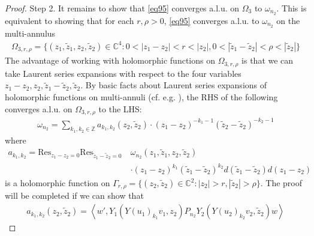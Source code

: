 \documentclass[11pt,b5paper,notitlepage]{article}
\theoremstyle{definition}
\theoremstyle{plain}
\newcommand{\wtd}{\widetilde}
\newcommand{\Res}{\mathrm{Res}}
\newcommand{\Cbb}{\mathbb C}
\newcommand{\Zbb}{\mathbb Z}
\newcommand{\<}{\left\langle}
\renewcommand{\>}{\right\rangle}
\numberwithin{equation}{subsection}
\begin{document}
\begin{proof}
Step 2. It remains to show that \eqref{eq95} converges a.l.u. on $\Omega_3$ to $\omega_{n_2}$. This is equivalent to showing that for each $r,\rho>0$, \eqref{eq95} converges a.l.u. to $\omega_{n_2}$ on the multi-annulus
\begin{align}
\Omega_{3,r,\rho}=\{(z_1,\wtd z_1,z_2,\wtd z_2)\in\Cbb^4:0<|z_1-z_2|<r<|z_2|,0<|\wtd z_1-\wtd z_2|<\rho<|\wtd z_2|\}
\end{align}
The advantage of working with holomorphic functions on $\Omega_{3,r,\rho}$ is that we can take Laurent series expansions with respect to the four variables $z_1-z_2,z_2,\wtd z_1-\wtd z_2,\wtd z_2$. By basic facts about Laurent series expansions of holomorphic functions on multi-annuli (cf. e.g. \cite[Lem. 7.13]{GuiLec}), the RHS of the following converges a.l.u. on $\Omega_{3,r,\rho}$ to the LHS:
\begin{align*}
\omega_{n_2}=\sum_{k_1,k_2\in\Zbb} a_{k_1,k_2}(z_2,\wtd z_2)\cdot (z_1-z_2)^{-k_1-1}(\wtd z_2-\wtd z_2)^{-k_2-1}
\end{align*}
where
\begin{align*}
a_{k_1,k_2}=\Res_{z_1-z_2=0}\Res_{\wtd z_1-\wtd z_2=0}~&\omega_{n_2}(z_1,\wtd z_1,z_2,\wtd z_2)\\
&\cdot (z_1-z_2)^{k_1}(\wtd z_1-\wtd z_2)^{k_2}d(\wtd z_1-\wtd z_2)d(z_1-z_2)
\end{align*}
is a holomorphic function on $\Gamma_{r,\rho}=\{(z_2,\wtd z_2)\in\Cbb^2:|z_2|>r,|\wtd z_2|>\rho\}$. The proof will be completed if we can show that
\begin{align}
a_{k_1,k_2}(z_2,\wtd z_2)=\<w',Y_1(Y(u_1)_{k_1}v_1,z_2)P_{n_2}Y_2(Y(u_2)_{k_2}v_2,\wtd z_2)w\>  \label{eq97}
\end{align}



\end{proof}
\end{document}
